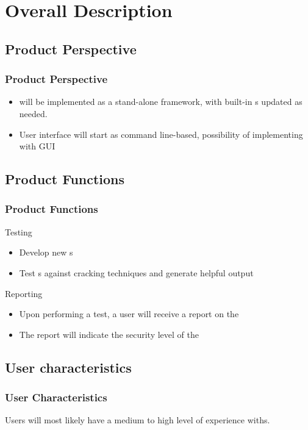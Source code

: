 
\section{Overall Description}


\subsection{Product Perspective}

\begin{frame} %
\frametitle{Product Perspective}
\begin{itemize}
\item \cry{} will be implemented as a stand-alone framework, with built-in \cs s updated as needed.
\item User interface will start as command line-based, possibility of implementing with GUI
\end{itemize}
\end{frame}


\subsection{Product Functions}
\begin{frame}
\frametitle{Product Functions}
Testing
\begin{itemize}
  \item Develop new \cs s
  \item Test \cs s against cracking techniques and generate helpful output
\end{itemize}
Reporting
\begin{itemize}
\item Upon performing a test, a user will receive a report on
  the \cs
\item The report will indicate the security level of the \cs
\end{itemize}
\end{frame}


\subsection{User characteristics}
\begin{frame}
\frametitle{User Characteristics}
Users will most likely have a medium  to high level of
experience with\cs s.
\end{frame}


